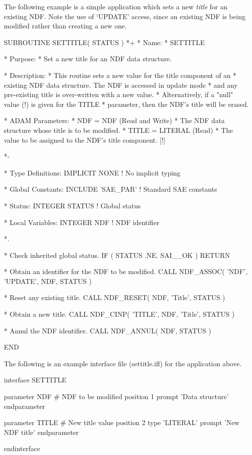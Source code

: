 \documentclass[twoside,11pt,nolof]{starlink}
\providecommand{\st}[1]{{\emph{#1}}}
\begin{document}
The following example is a simple application which sets a new
\st{title\/} for an existing NDF. Note the use of `UPDATE' access,
since an
existing NDF is being modified rather than creating a new one.

\small
\begin{terminalv}
      SUBROUTINE SETTITLE( STATUS )
*+
*  Name:
*     SETTITLE

*  Purpose:
*     Set a new title for an NDF data structure.

*  Description:
*     This routine sets a new value for the title component of an
*     existing NDF data structure. The NDF is accessed in update mode
*     and any pre-existing title is over-written with a new value.
*     Alternatively, if a "null" value (!) is given for the TITLE
*     parameter, then the NDF's title will be erased.

*  ADAM Parameters:
*     NDF = NDF (Read and Write)
*        The NDF data structure whose title is to be modified.
*     TITLE = LITERAL (Read)
*        The value to be assigned to the NDF's title component. [!]

*-

*  Type Definitions:
      IMPLICIT NONE              ! No implicit typing

*  Global Constants:
      INCLUDE 'SAE_PAR'          ! Standard SAE constants

*  Status:
      INTEGER STATUS             ! Global status

*  Local Variables:
      INTEGER NDF                ! NDF identifier

*.

*  Check inherited global status.
      IF ( STATUS .NE. SAI__OK ) RETURN

*  Obtain an identifier for the NDF to be modified.
      CALL NDF_ASSOC( 'NDF', 'UPDATE', NDF, STATUS )

*  Reset any existing title.
      CALL NDF_RESET( NDF, 'Title', STATUS )

*  Obtain a new title.
      CALL NDF_CINP( 'TITLE', NDF, 'Title', STATUS )

*  Annul the NDF identifier.
      CALL NDF_ANNUL( NDF, STATUS )

      END
\end{terminalv}
\normalsize

The following is an example  interface file
(settitle.ifl) for the application above.

\small
\begin{terminalv}
   interface SETTITLE

      parameter NDF                 # NDF to be modified
         position 1
         prompt   'Data structure'
      endparameter

      parameter TITLE               # New title value
         position 2
         type     'LITERAL'
         prompt   'New NDF title'
      endparameter

   endinterface
\end{terminalv}
\normalsize
\end{document}

